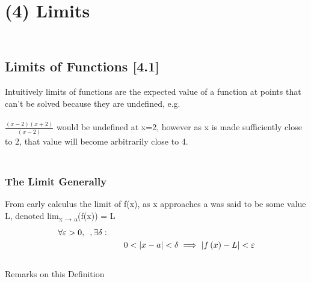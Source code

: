 \hypertarget{limits}{%
\section[\hfill\break
(4)
Limits]{\texorpdfstring{\protect\hypertarget{SECTION00010000000000000000}{}{}\protect\hypertarget{limits}{}{}~\\
(4) Limits}{ (4) Limits}}\label{limits}}

\hypertarget{limits-of-functions-4.1}{%
\subsection[\hfill\break
Limits of Functions
{[}4.1{]}]{\texorpdfstring{\protect\hypertarget{SECTION00011000000000000000}{}{}\protect\hypertarget{limits-of-functions-4.1}{}{}~\\
Limits of Functions
{[}4.1{]}}{ Limits of Functions {[}4.1{]}}}\label{limits-of-functions-4.1}}

Intuitively limits of functions are the expected value of a function at
points that can't be solved because they are undefined, e.g.\\
~\\
\(\frac{(x-2)\left( x+2 \right)}{\left( x-2 \right)}\) would be
undefined at x=2, however as x is made sufficiently close to 2, that
value will become arbitrarily close to 4.

\hypertarget{the-limit-generally}{%
\subsubsection[\hfill\break
The Limit
Generally]{\texorpdfstring{\protect\hypertarget{SECTION00011100000000000000}{}{}\protect\hypertarget{the-limit-generally}{}{}~\\
The Limit Generally}{ The Limit Generally}}\label{the-limit-generally}}

From early calculus the limit of {f}({x}), as {x} approaches {a} was
said to be some value L, denoted
lim\textsubscript{{x} → {a}}({f}({x})) = {L}\\
\[\begin{aligned}
\forall \varepsilon > 0,
\enspace, \exists \delta:
& \notag \\ &
\qquad 0 < \lvert x-a
\rvert < \delta
\implies \lvert f\left( x
\right) - L \rvert <
\varepsilon
\label{stewartlimdef}\end{aligned}\]\\

Remarks on this
Definition\protect\hypertarget{remarks-on-this-definition}{}{}

